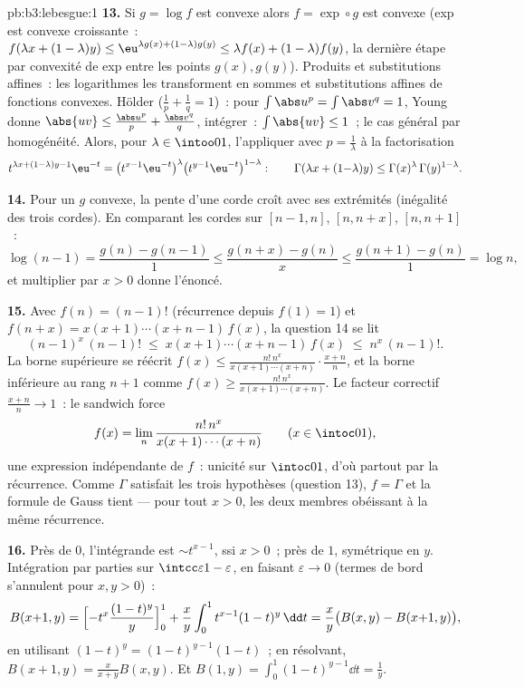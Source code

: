 \begin{solution}{pb:b3:lebesgue:1}
\textbf{13.} Si $g = \log f$ est convexe alors $f =
\exp\circ g$ est convexe (exp est convexe croissante~:
$f(\lambda x + (1-\lambda) y) \leq \eu^{\lambda g(x) +
(1-\lambda)g(y)} \leq \lambda f(x) + (1-\lambda)f(y)$, la
dernière étape par convexité de exp entre les points
$g(x), g(y)$). Produits et substitutions affines~: les
logarithmes les transforment en sommes et substitutions
affines de fonctions convexes. Hölder ($\frac1p + \frac1q
= 1$)~: pour $\int\abs u^p = \int\abs v^q = 1$, Young donne
$\abs{uv} \leq \frac{\abs u^p}p + \frac{\abs v^q}q$,
intégrer~: $\int\abs{uv} \leq 1$~; le cas général par
homogénéité. Alors, pour $\lambda \in \intoo01$,
l'appliquer avec $p = \frac1\lambda$ à la factorisation
\[
t^{\lambda x + (1-\lambda)y - 1}\eu^{-t}
= \bigl(t^{x-1}\eu^{-t}\bigr)^{\lambda}
\bigl(t^{y-1}\eu^{-t}\bigr)^{1-\lambda} :
\qquad
\Gamma(\lambda x + (1{-}\lambda)y) \leq
\Gamma(x)^\lambda\,\Gamma(y)^{1-\lambda} .
\]

\textbf{14.} Pour un $g$ convexe, la pente d'une corde
croît avec ses extrémités (inégalité des trois cordes). En
comparant les cordes sur $[n-1, n]$, $[n, n+x]$, $[n,
n+1]$~:
\[
\log(n-1) = \frac{g(n) - g(n-1)}1 \leq
\frac{g(n+x) - g(n)}x \leq \frac{g(n+1) - g(n)}1 = \log n,
\]
et multiplier par $x > 0$ donne l'énoncé.

\textbf{15.} Avec $f(n) = (n-1)!$ (récurrence depuis $f(1)
= 1$) et $f(n + x) = x(x+1)\cdots(x+n-1)\,f(x)$, la
question 14 se lit
\[
(n-1)^x\,(n-1)! \;\leq\; x(x+1)\cdots(x+n-1)\,f(x)
\;\leq\; n^x\,(n-1)! .
\]
La borne supérieure se réécrit $f(x) \leq
\frac{n!\,n^x}{x(x+1)\cdots(x+n)}\cdot\frac{x+n}n$, et la
borne inférieure au rang $n+1$ comme $f(x) \geq
\frac{n!\,n^x}{x(x+1)\cdots(x+n)}$. Le facteur correctif
$\frac{x+n}n \to 1$~: le sandwich force
\[
f(x) = \lim_n\frac{n!\,n^x}{x(x+1)\cdots(x+n)}
\qquad (x \in \intoc01),
\]
une expression indépendante de $f$~: unicité sur
$\intoc01$, d'où partout par la récurrence. Comme $\Gamma$
satisfait les trois hypothèses (question 13), $f =
\Gamma$ et la formule de Gauss tient --- pour tout $x >
0$, les deux membres obéissant à la même récurrence.

\textbf{16.} Près de $0$, l'intégrande est $\sim
t^{x-1}$,  ssi $x > 0$~; près de $1$, symétrique
en $y$. Intégration par parties sur
$\intcc\varepsilon{1-\varepsilon}$, en faisant
$\varepsilon \to 0$ (termes de bord s'annulent pour $x, y >
0$)~:
\[
B(x{+}1, y) = \Bigl[-t^x\frac{(1-t)^y}y\Bigr]_0^1 +
\frac xy\int_0^1t^{x-1}(1-t)^y\,\dd t
= \frac xy\bigl(B(x, y) - B(x{+}1, y)\bigr),
\]
en utilisant $(1-t)^y = (1-t)^{y-1}(1 - t)$~; en résolvant,
$B(x+1, y) = \frac{x}{x+y}B(x, y)$. Et $B(1, y) =
\int_0^1(1-t)^{y-1}\dd t = \frac1y$.


\end{solution}
